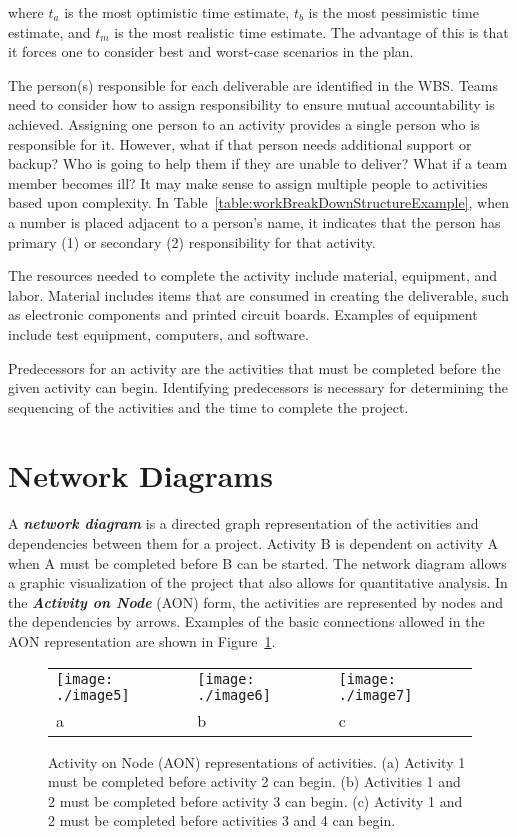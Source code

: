 where $t_a$ is the most optimistic time
estimate, $t_b$ is the most pessimistic
time estimate, and $t_m$ is the most
realistic time estimate. The advantage of this is that it forces one to
consider best and worst-case scenarios in the plan.

The person(s) responsible for each deliverable are identified in the
WBS. Teams need to consider how to assign responsibility to ensure
mutual accountability is achieved. Assigning one person to an activity
provides a single person who is responsible for it. However, what if
that person needs additional support or backup? Who is going to help
them if they are unable to deliver? What if a team member becomes ill?
It may make sense to assign multiple people to activities based upon
complexity. In Table~\ref{table:workBreakDownStructureExample}, 
when a number is placed adjacent to a
person's name, it indicates that the person has primary (1) or secondary
(2) responsibility for that activity.

The resources needed to complete the activity include material,
equipment, and labor. Material includes items that are consumed in
creating the deliverable, such as electronic components and printed
circuit boards. Examples of equipment include test equipment, computers,
and software.

Predecessors for an activity are the activities that must be completed
before the given activity can begin. Identifying predecessors is
necessary for determining the sequencing of the activities and the time
to complete the project.

\section{Network Diagrams}
\label{section:network-diagrams}

A \emph{\textbf{network diagram}} is a directed graph representation of
the activities and dependencies between them for a project. Activity B
is dependent on activity A when A must be completed before B can be
started. The network diagram allows a graphic visualization of the
project that also allows for quantitative analysis. In the
\emph{\textbf{Activity on Node}} (AON) form, the activities are
represented by nodes and the dependencies by arrows. Examples of the
basic connections allowed in the AON representation are shown in 
Figure~\ref{figure:activityOnNode}.


\begin{figure}[h]
\centering
\begin{tabular}{m{5cm}m{5cm}m{5cm}}
\texttt{[image: ./image5]} &
\texttt{[image: ./image6]} & 
\texttt{[image: ./image7]} \\
a & b & c \\
\end{tabular}

\caption{Activity on Node (AON) representations of
activities. (a) Activity 1 must be completed before activity 2 can
begin. (b) Activities 1 and 2 must be completed before activity 3 can
begin. (c) Activity 1 and 2 must be completed before activities 3 and 4
can begin.}
\label{figure:activityOnNode}
\end{figure}


